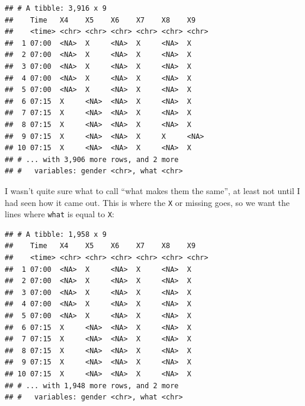 \documentclass[]{tufte-book}
\newenvironment{Shaded}{}{}
\newcommand{\DataTypeTok}[1]{\textcolor[rgb]{0.56,0.13,0.00}{#1}}
\newcommand{\KeywordTok}[1]{\textcolor[rgb]{0.00,0.44,0.13}{\textbf{#1}}}
\newcommand{\NormalTok}[1]{#1}
\newcommand{\OperatorTok}[1]{\textcolor[rgb]{0.40,0.40,0.40}{#1}}
\newcommand{\StringTok}[1]{\textcolor[rgb]{0.25,0.44,0.63}{#1}}
\theoremstyle{definition}
\theoremstyle{definition}
\theoremstyle{definition}
\theoremstyle{remark}
\begin{document}
\begin{verbatim}
## # A tibble: 3,916 x 9
##    Time   X4    X5    X6    X7    X8    X9   
##    <time> <chr> <chr> <chr> <chr> <chr> <chr>
##  1 07:00  <NA>  X     <NA>  X     <NA>  X    
##  2 07:00  <NA>  X     <NA>  X     <NA>  X    
##  3 07:00  <NA>  X     <NA>  X     <NA>  X    
##  4 07:00  <NA>  X     <NA>  X     <NA>  X    
##  5 07:00  <NA>  X     <NA>  X     <NA>  X    
##  6 07:15  X     <NA>  <NA>  X     <NA>  X    
##  7 07:15  X     <NA>  <NA>  X     <NA>  X    
##  8 07:15  X     <NA>  <NA>  X     <NA>  X    
##  9 07:15  X     <NA>  <NA>  X     X     <NA> 
## 10 07:15  X     <NA>  <NA>  X     <NA>  X    
## # ... with 3,906 more rows, and 2 more
## #   variables: gender <chr>, what <chr>
\end{verbatim}

I wasn't quite sure what to call ``what makes them the same'', at least
not until I had seen how it came out. This is where the \texttt{X} or
missing goes, so we want the lines where \texttt{what} is equal to
\texttt{X}:

\begin{Shaded}
\end{Shaded}

\begin{verbatim}
## # A tibble: 1,958 x 9
##    Time   X4    X5    X6    X7    X8    X9   
##    <time> <chr> <chr> <chr> <chr> <chr> <chr>
##  1 07:00  <NA>  X     <NA>  X     <NA>  X    
##  2 07:00  <NA>  X     <NA>  X     <NA>  X    
##  3 07:00  <NA>  X     <NA>  X     <NA>  X    
##  4 07:00  <NA>  X     <NA>  X     <NA>  X    
##  5 07:00  <NA>  X     <NA>  X     <NA>  X    
##  6 07:15  X     <NA>  <NA>  X     <NA>  X    
##  7 07:15  X     <NA>  <NA>  X     <NA>  X    
##  8 07:15  X     <NA>  <NA>  X     <NA>  X    
##  9 07:15  X     <NA>  <NA>  X     <NA>  X    
## 10 07:15  X     <NA>  <NA>  X     <NA>  X    
## # ... with 1,948 more rows, and 2 more
## #   variables: gender <chr>, what <chr>
\end{verbatim}
\end{document}

